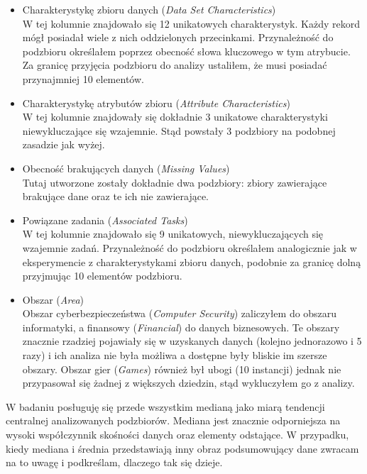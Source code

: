 \begin{itemize}
  \item Charakterystykę zbioru danych (\emph{Data Set Characteristics}) \\
        W tej kolumnie znajdowało się 12 unikatowych charakterystyk.
        Każdy rekord mógł posiadał wiele z nich oddzielonych przecinkami.
        Przynależność do podzbioru określałem poprzez obecność słowa kluczowego w tym atrybucie.
        Za granicę przyjęcia podzbioru do analizy ustaliłem, że musi posiadać przynajmniej 10 elementów.

  \item Charakterystykę atrybutów zbioru (\emph{Attribute Characteristics}) \\
        W tej kolumnie znajdowały się dokładnie 3 unikatowe charakterystyki niewykluczające się wzajemnie.
        Stąd powstały 3 podzbiory na podobnej zasadzie jak wyżej.

  \item Obecność brakujących danych (\emph{Missing Values}) \\
        Tutaj utworzone zostały dokładnie dwa podzbiory: zbiory zawierające brakujące dane oraz te ich nie zawierające.

  \item Powiązane zadania (\emph{Associated Tasks}) \\
        W tej kolumnie znajdowało się 9 unikatowych, niewykluczających się wzajemnie zadań.
        Przynależność do podzbioru określałem analogicznie jak w eksperymencie z charakterystykami zbioru danych, podobnie za granicę dolną przyjmując 10 elementów podzbioru.

  \item Obszar (\emph{Area}) \\
        Obszar cyberbezpieczeństwa (\emph{Computer Security}) zaliczyłem do obszaru informatyki, a finansowy (\emph{Financial}) do danych biznesowych.
        Te obszary znacznie rzadziej pojawiały się w uzyskanych danych (kolejno jednorazowo i 5 razy) i ich analiza nie była możliwa a dostępne były bliskie im szersze obszary.
        Obszar gier (\emph{Games}) również był ubogi (10 instancji) jednak nie przypasował się żadnej z większych dziedzin, stąd wykluczyłem go z analizy.

\end{itemize}

W badaniu posługuję się przede wszystkim medianą jako miarą tendencji centralnej analizowanych podzbiorów.
Mediana jest znacznie odporniejsza na wysoki współczynnik skośności danych oraz elementy odstające.
W przypadku, kiedy mediana i średnia przedstawiają inny obraz podsumowujący dane zwracam na to uwagę i podkreślam, dlaczego tak się dzieje.

